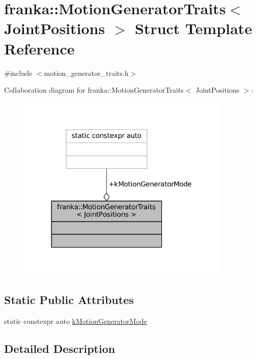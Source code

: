 \hypertarget{structfranka_1_1MotionGeneratorTraits_3_01JointPositions_01_4}{}\section{franka\+:\+:Motion\+Generator\+Traits$<$ Joint\+Positions $>$ Struct Template Reference}
\label{structfranka_1_1MotionGeneratorTraits_3_01JointPositions_01_4}


{\ttfamily \#include $<$motion\+\_\+generator\+\_\+traits.\+h$>$}



Collaboration diagram for franka\+:\+:Motion\+Generator\+Traits$<$ Joint\+Positions $>$\+:
\nopagebreak
\begin{figure}[H]
\begin{center}
\leavevmode
\includegraphics[width=287pt]{structfranka_1_1MotionGeneratorTraits_3_01JointPositions_01_4__coll__graph}
\end{center}
\end{figure}
\subsection*{Static Public Attributes}
\begin{DoxyCompactItemize}
\item 
static constexpr auto \hyperlink{structfranka_1_1MotionGeneratorTraits_3_01JointPositions_01_4_a4c38fe31d9a4d30c039f5068ddf42af1}{k\+Motion\+Generator\+Mode}
\end{DoxyCompactItemize}


\subsection{Detailed Description}
